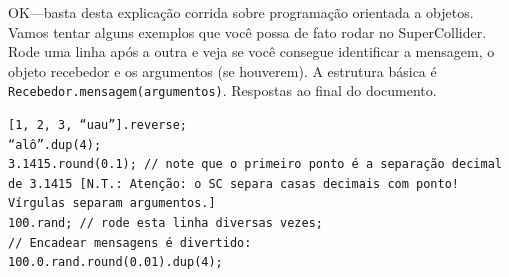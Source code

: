 OK---basta desta explicação corrida sobre programação orientada a objetos. Vamos tentar alguns exemplos que você possa de fato rodar no SuperCollider. Rode uma linha após a outra e veja se você consegue identificar a mensagem, o objeto recebedor e os argumentos (se houverem). A estrutura básica é \texttt{Recebedor.mensagem(argumentos)}. Respostas ao final do documento.

 
\begin{lstlisting}[style=SuperCollider-IDE, basicstyle=\scttfamily\footnotesize]
[1, 2, 3, “uau”].reverse;
“alô”.dup(4); 
3.1415.round(0.1); // note que o primeiro ponto é a separação decimal de 3.1415 [N.T.: Atenção: o SC separa casas decimais com ponto! Vírgulas separam argumentos.]
100.rand; // rode esta linha diversas vezes;
// Encadear mensagens é divertido:
100.0.rand.round(0.01).dup(4);
\end{lstlisting}
